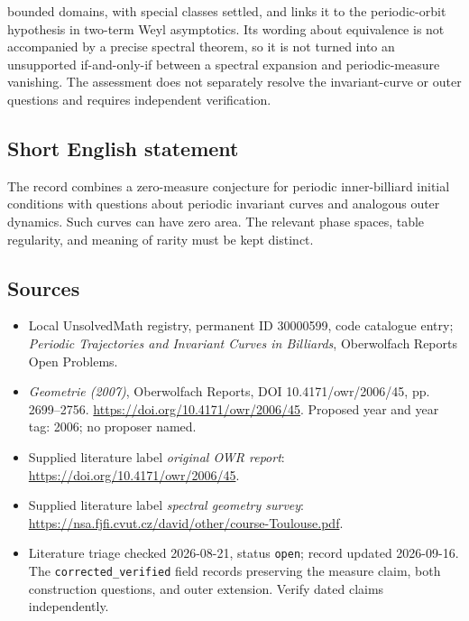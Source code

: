 \documentclass[11pt]{article}
\begin{document}
bounded domains, with special classes settled, and links it to the periodic-orbit hypothesis in two-term Weyl asymptotics. Its wording about equivalence is not accompanied by a precise spectral theorem, so it is not turned into an unsupported if-and-only-if between a spectral expansion and periodic-measure vanishing. The assessment does not separately resolve the invariant-curve or outer questions and requires independent verification.
\subsection{Short English statement}
The record combines a zero-measure conjecture for periodic inner-billiard initial conditions with questions about periodic invariant curves and analogous outer dynamics. Such curves can have zero area. The relevant phase spaces, table regularity, and meaning of rarity must be kept distinct.
\subsection{Sources}
\begin{itemize}\item Local UnsolvedMath registry, permanent ID 30000599, code catalogue entry; \emph{Periodic Trajectories and Invariant Curves in Billiards}, Oberwolfach Reports Open Problems.\item \emph{Geometrie (2007)}, Oberwolfach Reports, DOI 10.4171/owr/2006/45, pp. 2699--2756. \url{https://doi.org/10.4171/owr/2006/45}. Proposed year and year tag: 2006; no proposer named.\item Supplied literature label \emph{original OWR report}: \url{https://doi.org/10.4171/owr/2006/45}.\item Supplied literature label \emph{spectral geometry survey}: \url{https://nsa.fjfi.cvut.cz/david/other/course-Toulouse.pdf}.\item Literature triage checked 2026-08-21, status \texttt{open}; record updated 2026-09-16. The \texttt{corrected\_verified} field records preserving the measure claim, both construction questions, and outer extension. Verify dated claims independently.\end{itemize}
\end{document}
